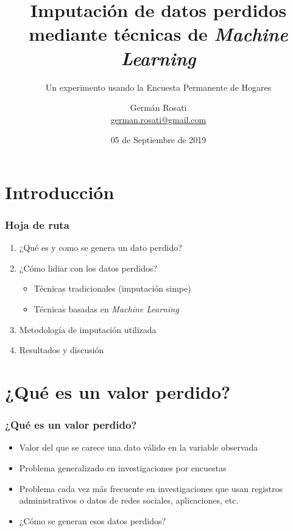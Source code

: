 \documentclass{beamer}
\title[Imputación usando Ensamble Learning]{Imputación de datos perdidos mediante técnicas de \textit{Machine Learning}}
\subtitle{Un experimento usando la Encuesta Permanente de Hogares}
\author{Germán Rosati \\ \href{mailto: german.rosati@gmail.com}{german.rosati@gmail.com}}
\institute{CONICET/ IDAES-UNSAM / PIMSA / UNTREF}
\date{05 de Septiembre de 2019}
\begin{document}
\frame{\titlepage}


\section{Introducción}
\begin{frame}
	\frametitle{Hoja de ruta}
	\begin{enumerate}
		\item ¿Qué es y como se genera un dato perdido?
		\item ¿Cómo lidiar con los datos perdidos?
		\begin{itemize}
			\item Técnicas tradicionales (imputación simpe)
			\item Técnicas basadas en \textit{Machine Learning}
		\end{itemize}
		\item Metodología de imputación utilizada
		\item Resultados y discusión
	\end{enumerate}
\end{frame}

\section{¿Qué es un valor perdido?}
\begin{frame}
\frametitle{¿Qué es un valor perdido?}
	\begin{itemize}
		\item{Valor del que se carece una dato válido en la variable observada}
		\item{Problema generalizado en investigaciones por encuestas}
		\item{Problema cada vez más frecuente en investigaciones que usan registros administrativos o datos de redes sociales, aplicaciones, etc.}
		\item{¿Cómo se generan esos datos perdidos?}
	\end{itemize}
\end{frame}
\end{document}

